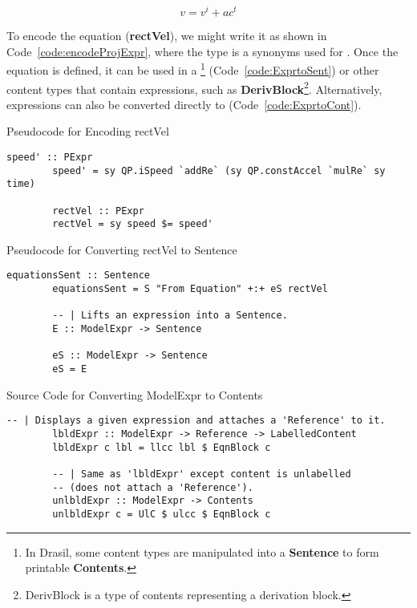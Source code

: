 \begin{equation}
	\label{eq:velocity}
	v=v^i+ac^t
\end{equation}

To encode the equation (\textbf{rectVel}), we might write it as shown in 
Code~\ref{code:encodeProjExpr}, where the type  is a synonyms 
used for . Once the equation is defined, it can be used 
in a  \footnote{In Drasil, some content types are 
manipulated into a \textbf{Sentence} to form printable \textbf{Contents}.} 
(Code~\ref{code:ExprtoSent}) or other content types that contain expressions, 
such as \textbf{DerivBlock}\footnote{DerivBlock is a type of contents 
representing a derivation block.}. Alternatively, expressions can also be 
converted directly to  (Code~\ref{code:ExprtoCont}).

\begin{listing}[h]
	\caption{Pseudocode for Encoding rectVel}
	\label{code:encodeProjExpr}
	\begin{lstlisting}[language=haskell1]
		speed' :: PExpr
		speed' = sy QP.iSpeed `addRe` (sy QP.constAccel `mulRe` sy time)
		
		rectVel :: PExpr
		rectVel = sy speed $= speed'
	\end{lstlisting}
\end{listing}

\begin{listing}[h]
	\caption{Pseudocode for Converting rectVel to Sentence}
	\label{code:ExprtoSent}
	\begin{lstlisting}[language=haskell1]
		equationsSent :: Sentence
		equationsSent = S "From Equation" +:+ eS rectVel
		
		-- | Lifts an expression into a Sentence.
		E :: ModelExpr -> Sentence
		
		eS :: ModelExpr -> Sentence
		eS = E
	\end{lstlisting}
\end{listing}

\begin{listing}[h]
	\caption{Source Code for Converting ModelExpr to Contents}
	\label{code:ExprtoCont}
	\begin{lstlisting}[language=haskell1]
		-- | Displays a given expression and attaches a 'Reference' to it.
		lbldExpr :: ModelExpr -> Reference -> LabelledContent
		lbldExpr c lbl = llcc lbl $ EqnBlock c
		
		-- | Same as 'lbldExpr' except content is unlabelled 
		-- (does not attach a 'Reference').
		unlbldExpr :: ModelExpr -> Contents
		unlbldExpr c = UlC $ ulcc $ EqnBlock c
	\end{lstlisting}
\end{listing}

